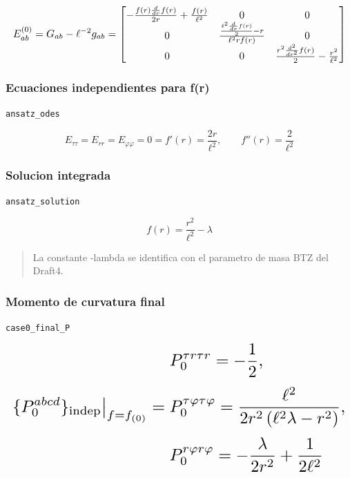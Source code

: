 \documentclass[11pt,a4paper]{article}
\begin{document}
\[
\resizebox{\textwidth}{!}{$\displaystyle E^{(0)}_{ab}=G_{ab}-\ell^{-2}g_{ab} = \left[\begin{matrix}- \frac{f{\left(r \right)} \frac{d}{d r} f{\left(r \right)}}{2 r} + \frac{f{\left(r \right)}}{\ell^{2}} & 0 & 0\\0 & \frac{\frac{\ell^{2} \frac{d}{d r} f{\left(r \right)}}{2} - r}{\ell^{2} r f{\left(r \right)}} & 0\\0 & 0 & \frac{r^{2} \frac{d^{2}}{d r^{2}} f{\left(r \right)}}{2} - \frac{r^{2}}{\ell^{2}}\end{matrix}\right]$}
\]

\subsubsection{Ecuaciones independientes para f(r)}

\noindent\texttt{ansatz\_odes}\par\nopagebreak[4]

\[
E_{\tau\tau}=E_{rr}=E_{\varphi\varphi}=0 = f'(r)=\frac{2r}{\ell^2},\qquad f''(r)=\frac{2}{\ell^2}
\]

\subsubsection{Solucion integrada}

\noindent\texttt{ansatz\_solution}\par\nopagebreak[4]

\[
f(r) = \frac{r^2}{\ell^2}-\lambda
\]

\begin{quote}\small La constante -lambda se identifica con el parametro de masa BTZ del Draft4.\end{quote}

\subsubsection{Momento de curvatura final}

\noindent\texttt{case0\_final\_P}\par\nopagebreak[4]

\[
\resizebox{\textwidth}{!}{$\displaystyle \{P_0^{abcd}\}_{\mathrm{indep}}\big|_{f=f_{(0)}} = \begin{aligned}&P_0^{{\tau}{r}{\tau}{r}}=- \frac{1}{2},\\[2pt]&P_0^{{\tau}{\varphi}{\tau}{\varphi}}=\frac{\ell^{2}}{2 r^{2} \left(\ell^{2} \lambda - r^{2}\right)},\\[2pt]&P_0^{{r}{\varphi}{r}{\varphi}}=- \frac{\lambda}{2 r^{2}} + \frac{1}{2 \ell^{2}}\end{aligned}$}
\]
\end{document}
